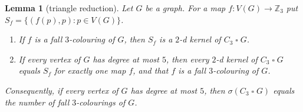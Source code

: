 \documentclass[11pt]{article}
\theoremstyle{plain}
\newtheorem{lemma}[lemma]{Lemma}
\theoremstyle{definition}
\theoremstyle{remark}
\newcommand{\Z}{\mathbb{Z}}
\newcommand{\T}{\mathbin{\square}}
\begin{document}
\begin{lemma}[triangle reduction]\label{lem:triangle}
Let $G$ be a graph. For a map $f : V(G) \to \Z_3$ put $S_f = \{(f(p), p) : p \in V(G)\}$.
\begin{enumerate}[label=(\alph*)]
  \item If $f$ is a fall $3$-colouring of $G$, then $S_f$ is a $2$-d kernel of $C_3 \T G$.
  \item If every vertex of $G$ has degree at most $5$, then every $2$-d kernel of $C_3 \T G$
        equals $S_f$ for exactly one map $f$, and that $f$ is a fall $3$-colouring of $G$.
\end{enumerate}
Consequently, if every vertex of $G$ has degree at most $5$, then $\sigma(C_3 \T G)$ equals
the number of fall $3$-colourings of $G$.
\end{lemma}
\end{document}
